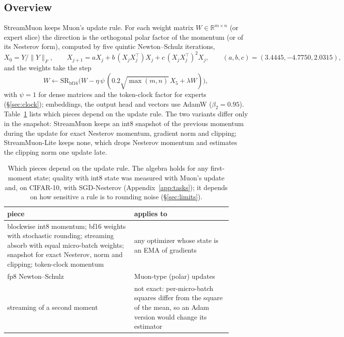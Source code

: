 \documentclass[10pt]{article}
\newcommand{\method}{StreamMuon}\newcommand{\lite}{StreamMuon-Lite}
\newcommand{\R}{\mathbb{R}}
\begin{document}
\subsection{Overview}
\label{sec:rule}
\method{} keeps Muon's update rule. For each weight matrix $W\in\R^{m\times n}$ (or expert slice) the direction is the
orthogonal polar factor of the momentum (or of its Nesterov form), computed by five quintic Newton--Schulz iterations,
\begin{equation}
  X_0 = Y/\|Y\|_F,\qquad X_{j+1}=aX_j+b\,(X_jX_j^{\top})X_j+c\,(X_jX_j^{\top})^2X_j,\qquad (a,b,c)=(3.4445,-4.7750,2.0315),
  \label{eq:ns}
\end{equation}
and the weights take the step
\begin{equation}
  W \leftarrow \mathrm{SR}_{\mathrm{bf16}}\!\big(W-\eta\,\psi\,(0.2\sqrt{\max(m,n)}\,X_5+\lambda W)\big),
  \label{eq:wd}
\end{equation}
with $\psi=1$ for dense matrices and the token-clock factor for experts (\S\ref{sec:clock}); embeddings, the output head
and vectors use AdamW ($\beta_2=0.95$). Table~\ref{tab:pieces} lists which pieces depend on the update rule. The two
variants differ only in the snapshot: \method{} keeps an int8 snapshot of the previous momentum during the update for
exact Nesterov momentum, gradient norm and clipping; \lite{} keeps none, which drops Nesterov momentum and estimates
the clipping norm one update late.

\begin{table}[!t]
\centering\small
\caption{Which pieces depend on the update rule. The algebra holds for any first-moment state; quality with int8 state
was measured with Muon's update and, on CIFAR-10, with SGD-Nesterov (Appendix~\ref{app:tasks}); it depends on how
sensitive a rule is to rounding noise (\S\ref{sec:limits}).}
\label{tab:pieces}
\begin{tabular}{p{0.52\linewidth}p{0.4\linewidth}}
\toprule
piece & applies to \\
\midrule
blockwise int8 momentum; bf16 weights with stochastic rounding; streaming absorb with equal micro-batch weights;
snapshot for exact Nesterov, norm and clipping; token-clock momentum & any optimizer whose state is an EMA of gradients \\
fp8 Newton--Schulz & Muon-type (polar) updates \\
streaming of a second moment & not exact: per-micro-batch squares differ from the square of the mean, so an Adam
version would change its estimator \\
\bottomrule
\end{tabular}
\end{table}
\end{document}
